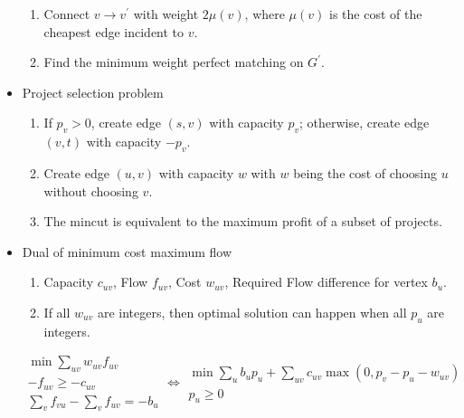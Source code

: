 \begin{itemize}
\begin{enumerate}
      \item Connect $v \to v^\prime$ with weight $2\mu(v)$, where $\mu(v)$ is the cost of the cheapest edge incident to $v$.
      \item Find the minimum weight perfect matching on $G^\prime$.
    \end{enumerate}
    \item Project selection problem
    \begin{enumerate}
      \item If $p_v > 0$, create edge $(s, v)$ with capacity $p_v$; otherwise, create edge $(v, t)$ with capacity $-p_v$.
      \item Create edge $(u, v)$ with capacity $w$ with $w$ being the cost of choosing $u$ without choosing $v$.
      \item The mincut is equivalent to the maximum profit of a subset of projects.
    \end{enumerate}
    \item Dual of minimum cost maximum flow
    \begin{enumerate}
      \item Capacity $c_{uv}$, Flow $f_{uv}$, Cost $w_{uv}$, Required Flow difference for vertex $b_u$.
      \item If all $w_{uv}$ are integers, then optimal solution can happen when all $p_u$ are integers.
    \end{enumerate}
    $$
    \begin{aligned}\min\sum_{uv} w_{uv}f_{uv} \\ -f_{uv} \geq -c_{uv} \\ \sum_{v} f_{vu} - \sum_{v} f_{uv} = -b_u\end{aligned}
    \Leftrightarrow
    \begin{aligned}\min\sum_{u} b_up_u + \sum_{uv}c_{uv}\max(0, p_v - p_u - w_{uv}) \\ p_u \geq 0 \end{aligned}
    $$
\end{itemize}